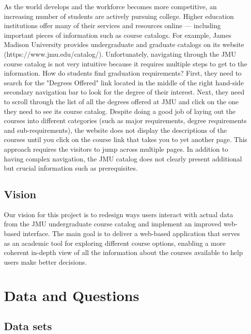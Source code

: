 \documentclass[11pt]{article}
\begin{document}
As the world develops and the workforce becomes more competitive, an increasing number of students are actively pursuing college. Higher education institutions offer many of their services and resources online --- including important pieces of information such as course catalogs. For example, James Madison University provides undergraduate and graduate catalogs on its website (https://www.jmu.edu/catalog/). Unfortunately, navigating through the JMU course catalog is not very intuitive because it requires multiple steps to get to the information. How do students find graduation requirements? First, they need to search for the "Degrees Offered" link located in the middle of the right hand-side secondary navigation bar to look for the degree of their interest. Next, they need to scroll through the list of all the degrees offered at JMU and click on the one they need to see its course catalog. Despite doing a good job of laying out the courses into different categories (such as major requirements, degree requirements and sub-requirements), the website does not display the descriptions of the courses until you click on the course link that takes you to yet another page. This approach requires the visitors to jump across multiple pages. In addition to having complex navigation, the JMU catalog does not clearly present additional but crucial information such as prerequisites. 

\subsection*{Vision}
Our vision for this project is to redesign ways users interact with actual data from the JMU undergraduate course catalog and implement an improved web-based interface. The main goal is to deliver a web-based application that serves as an academic tool for exploring different course options, enabling a more coherent in-depth view of all the information about the courses available to help users make better decisions. 

\section*{Data and Questions}
\subsection*{Data sets}
\end{document}
